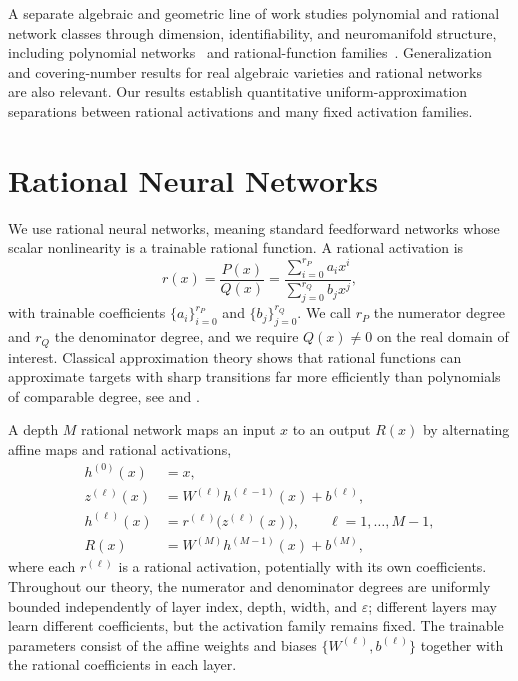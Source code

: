\documentclass{article}
\theoremstyle{plain}
\theoremstyle{definition}
\theoremstyle{remark}
\begin{document}
 {A separate algebraic and geometric line of work studies polynomial and rational network classes through dimension, identifiability, and neuromanifold structure, including polynomial networks~\cite{kileel2019expressive,marchetti2025invitation,shahverdi2025razor,shahverdi2024geometry,massarenti2025alexander} and rational-function families~\cite{conca2023taylor,grosdos2025algebraic}. Generalization and covering-number results for real algebraic varieties and rational networks~\cite{zhang2025covering} are also relevant. Our results establish quantitative uniform-approximation separations between rational activations and many fixed activation families.}


\section{Rational Neural Networks}\label{sec:rational_nn}

We use rational neural networks, meaning standard feedforward networks whose scalar nonlinearity is a trainable rational function. A rational activation is
\begin{equation}
\label{eq:rational_activation}
r(x)
=
\frac{P(x)}{Q(x)}
=
\frac{\sum_{i=0}^{r_P} a_i x^i}{\sum_{j=0}^{r_Q} b_j x^j},
\end{equation}
with trainable coefficients $\{a_i\}_{i=0}^{r_P}$ and $\{b_j\}_{j=0}^{r_Q}$. We call $r_P$ the numerator degree and $r_Q$ the denominator degree, and we require $Q(x)\neq 0$ on the real domain of interest. Classical approximation theory shows that rational functions can approximate targets with sharp transitions far more efficiently than polynomials of comparable degree, see \citet{trefethen2019approximation} and \citet{gonchar2011rational}.

A depth $M$ rational network maps an input $x$ to an output $R(x)$ by alternating affine maps and rational activations,
\begin{equation}
\label{eq:rational_network_def}
\begin{aligned}
h^{(0)}(x) &= x,\\
z^{(\ell)}(x) &= W^{(\ell)}h^{(\ell-1)}(x)+b^{(\ell)},\\
h^{(\ell)}(x) &= r^{(\ell)}\!\bigl(z^{(\ell)}(x)\bigr), \qquad \ell=1,\dots,M-1,\\
R(x) &= W^{(M)}h^{(M-1)}(x)+b^{(M)},
\end{aligned}
\end{equation}
where each $r^{(\ell)}$ is a rational activation, potentially with its own coefficients.  {Throughout our theory, the numerator and denominator degrees are uniformly bounded independently of layer index, depth, width, and $\varepsilon$; different layers may learn different coefficients, but the activation family remains fixed.} The trainable parameters consist of the affine weights and biases $\{W^{(\ell)},b^{(\ell)}\}$ together with the rational coefficients in each layer.
\end{document}
